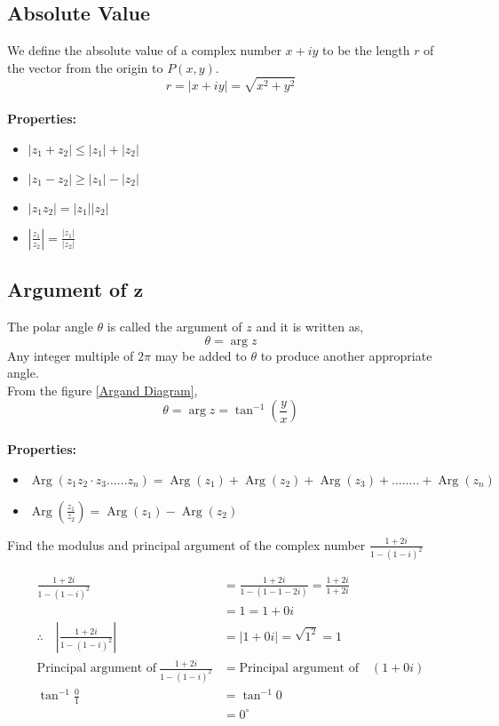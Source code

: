    \subsection{Absolute Value}
    We define the absolute value of a complex number $x+i y$ to be the length ${r}$ of the vector from the origin to $P(x, y)$. 
    $$
    r=|x+i y|=\sqrt{x^{2}+y^{2}}
    $$
    \\\textbf{Properties:}
    \begin{itemize}
    	\item $\left|z_{1}+z_{2}\right| \leq\left|z_{1}\right|+\left|z_{2}\right|$
    	\item $\left|z_{1}-z_{2}\right| \geq\left|z_{1}\right|-\left|z_{2}\right|$
    	\item $\left|z_{1} z_{2}\right|=\left|z_{1}\right|\left|z_{2}\right|$
    	\item $\left|\frac{z_{1}}{z_{2}}\right|=\frac{\left|z_{1}\right|}{\left|z_{2}\right|}$
    \end{itemize}
    \subsection{Argument of $\mathbf{z}$ }
    The polar angle $\theta$ is called the {argument} of $z$ and it is written as, $${\theta=\arg z }$$ Any integer multiple of $2 \pi$ may be added to $\theta$ to produce another appropriate  angle.\\From the figure \ref{Argand Diagram},
    $${\theta=\arg z }=\tan ^{-1}\left(\frac{y}{x}\right)$$
    \\\textbf{Properties:}
    \begin{itemize}
    	\item $\operatorname{Arg}\left(z_{1}  z_{2} \cdot z_{3} \ldots \ldots z_{n}\right)=\operatorname{Arg} \left(z_{1}\right)+\operatorname{Arg}  \left(z_{2}\right)+\operatorname{Arg}  \left(z_{3}\right)+\ldots \ldots . .+\operatorname{Arg}\left(z_{n}\right)$
    	\item $\operatorname{Arg}\left(\frac{z_{1}}{z_{2}}\right)=\operatorname{Arg}\left(z_{1}\right)-\operatorname{Arg}\left(z_{2}\right)$
    \end{itemize}
\begin{exercise}
	Find the modulus and principal argument of the complex number
	$\frac{1+2 i}{1-(1-i)^{2}}$
\end{exercise}
\begin{answer}
	\begin{align*}
	\frac{1+2 i}{1-(1-i)^{2}}&=\frac{1+2 i}{1-(1-1-2 i)}=\frac{1+2 i}{1+2 i}\\&=1=1+0 i \\
	\therefore \quad\left|\frac{1+2 i}{1-(1-i)^{2}}\right|&=|1+0 i|=\sqrt{1^{2}}=1\\
	\text{Principal argument of}\ \frac{1+2 i}{1-(1-i)^{2}}&= \text{Principal argument of} \quad \left( 1+0 i\right) \\
	\tan ^{-1} \frac{0}{1}&=\tan ^{-1} 0\\&=0^{\circ}
	\end{align*}
\end{answer}

